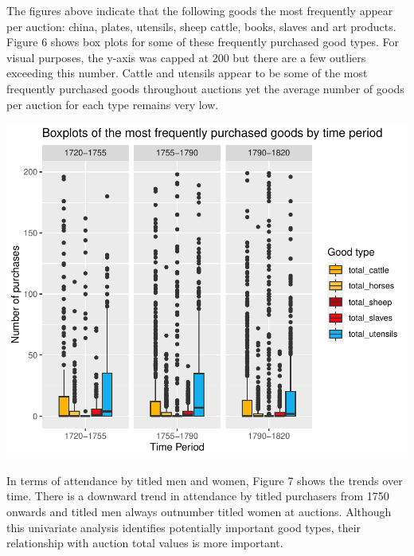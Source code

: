 \documentclass[11pt,preprint, authoryear]{elsarticle}
\numberwithin{equation}{section}
\numberwithin{figure}{section}
\numberwithin{table}{section}
\begin{document}
The figures above indicate that the following goods the most frequently
appear per auction: china, plates, utensils, sheep cattle, books, slaves
and art products. Figure 6 shows box plots for some of these frequently
purchased good types. For visual purposes, the y-axis was capped at 200
but there are a few outliers exceeding this number. Cattle and utensils
appear to be some of the most frequently purchased goods throughout
auctions yet the average number of goods per auction for each type
remains very low.

\begin{center}\includegraphics{Project_write_up_files/figure-latex/Figure6-1} \end{center}

In terms of attendance by titled men and women, Figure 7 shows the
trends over time. There is a downward trend in attendance by titled
purchasers from 1750 onwards and titled men always outnumber titled
women at auctions. Although this univariate analysis identifies
potentially important good types, their relationship with auction total
values is more important.
\end{document}
